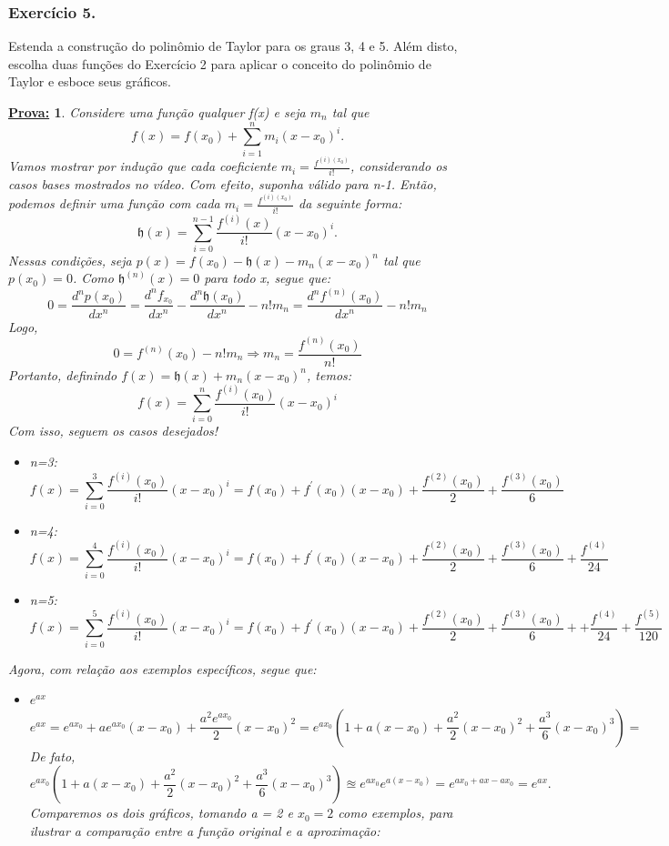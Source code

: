 \documentclass{article}
\newtheorem*{proof*}{\underline{Prova:}}
\begin{document}
\subsubsection{Exerc\'icio 5.}
Estenda a constru\c c\~ao do polin\^omio de Taylor para os graus 3, 4 e 5. Al\'em
disto, escolha duas fun\c c\~oes do Exerc\'icio 2 para aplicar o conceito do polin\^omio
de Taylor e esboce seus gr\'aficos.
\begin{proof*}
	Considere uma fun\c c\~ao qualquer f(x) e seja $m_n$ tal que
	\[
		f(x) = f(x_{0}) + \sum_{i=1}^{n}m_{i}(x-x_{0})^{i}.
	\]
	Vamos mostrar por indu\c c\~ao que cada coeficiente
	$m_{i}= \frac{f^{(i)(x_0)}}{i!}$, considerando os casos bases mostrados no v\'ideo.
	Com efeito, suponha v\'alido para n-1. Ent\~ao,
	podemos definir uma fun\c c\~ao com cada $m_{i}= \frac{f^{(i)(x_0)}}{i!}$ da
	seguinte forma:
	\[
		\mathfrak{h}(x) = \sum_{i=0}^{n-1}\frac{f^{(i)}(x)}{i!}(x-x_{0})^{i}.
	\]
	Nessas condi\c c\~oes, seja $p(x) = f(x_{0}) - \mathfrak{h}(x) - m_{n}(x-x_{0})
		^{n}$ tal que $p(x_{0}) = 0$. Como $\mathfrak{h}^{(n)}(x) = 0$ para todo x, segue que:
	\[
		0 = \frac{d^n p(x_0)}{dx^n} = \frac{d^n f_{x_0}}{dx^n} - \frac{d^n \mathfrak{h}(x_0)}{dx^n} - n!m_n = \frac{d^n f^{(n)}(x_0)}{dx^n} - n!m_n
	\]
	Logo,
	\[
		0 = f^{(n)}(x_0) - n!m_n \Rightarrow m_n = \frac{f^{(n)}(x_0)}{n!}
	\]
	Portanto, definindo $f(x) = \mathfrak{h}(x) + m_n(x-x_0)^n$, temos:
	\[
		f(x) = \sum_{i=0}^{n}\frac{f^{(i)}(x_{0})}{i!}(x-x_{0})^{i}
	\]
	Com isso, seguem os casos desejados!
	\begin{itemize}
		\item[a)] n=3:
		      \[
			      f(x) = \sum_{i=0}^{3}\frac{f^{(i)}(x_{0})}{i!}(x-x_{0})^{i}= f(x_{0}) + f^{'}(x_{0})(x-x_{0}) + \frac{f^{(2)}(x_{0})}{2}+ \frac{f^{(3)}(x_{0})}{6}
		      \]

		\item n=4:
		      \[
			      f(x) = \sum_{i=0}^{4}\frac{f^{(i)}(x_{0})}{i!}(x-x_{0})^{i}= f(x_{0}) + f^{'}(x_{0})(x-x_{0}) + \frac{f^{(2)}(x_{0})}{2}+ \frac{f^{(3)}(x_{0})}{6}+ \frac{f^{(4)}}{24}
		      \]

		\item n=5:
		      \[
			      f(x) = \sum_{i=0}^{5}\frac{f^{(i)}(x_{0})}{i!}(x-x_{0})^{i}= f(x_{0}) + f^{'}(x_{0})(x-x_{0}) + \frac{f^{(2)}(x_{0})}{2}+ \frac{f^{(3)}(x_{0})}{6}+ + \frac{f^{(4)}}{24}+ \frac{f^{(5)}}{120}
		      \]
	\end{itemize}
	Agora, com rela\c c\~ao aos exemplos espec\'ificos, segue que:
	\begin{itemize}
		\item $e^{ax}$
		      \[
			      e^{ax}= e^{ax_0}+ ae^{ax_0}(x-x_{0}) + \frac{a^{2}e^{ax_0}}{2}(x-x_{0})^{2} = e^{ax_0}(1 + a(x-x_0) + \frac{a^2}{2}(x-x_0)^2 + \frac{a^3}{6}(x-x_0)^3) =
		      \]
		      De fato,
		      $$
			      e^{ax_0}(1 + a(x-x_0) + \frac{a^2}{2}(x-x_0)^2 + \frac{a^3}{6}(x-x_0)^3) \approxeq e^{ax_0}e^{a(x-x_0)} = e^{ax_0 + ax - ax_0} = e^{ax}.
		      $$
		      Comparemos os dois gr\'aficos, tomando a = 2 e $x_{0}= 2$ como exemplos,
		      para ilustrar a compara\c c\~ao entre a fun\c c\~ao original e a aproxima\c
		      c\~ao:


\end{itemize}
\end{proof*}
\end{document}
